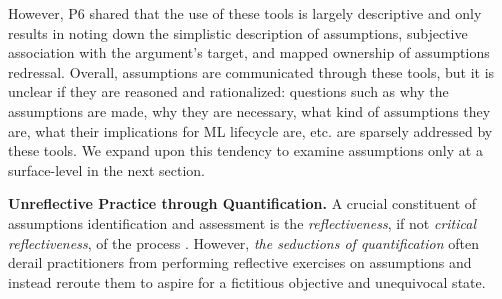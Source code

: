However, P6 shared that the use of these tools is largely descriptive and only results in noting down the simplistic description of assumptions, subjective association with the argument's target, and mapped ownership of assumptions redressal. 
Overall, assumptions are communicated through these tools, but it is unclear if they are reasoned and rationalized: questions such as why the assumptions are made, why they are necessary, what kind of assumptions they are, what their implications for ML lifecycle are, etc. are sparsely addressed by these tools. We expand upon this tendency to examine assumptions only at a surface-level in the next section.




\smallskip
\noindent \textbf{Unreflective Practice through Quantification.} A crucial constituent of assumptions identification and assessment is the \textit{reflectiveness}, if not \textit{critical reflectiveness}, of the process \cite{paul1993critical,paul1993workshop}. 
However, \textit{the seductions of quantification} \cite{merry2009seductions} often derail practitioners from performing reflective exercises on assumptions and instead reroute them to aspire for a fictitious objective and unequivocal state. 

\begin{quote}
\end{quote}

